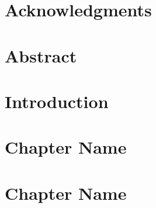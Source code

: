 \documentclass[11pt]{book}
\renewcommand{\baselinestretch}{1.2}
\begin{document}



\newpage
\thispagestyle{empty}
\renewcommand{\thesisdedication}{{\large Copyright \copyright~~Vishva Saravanan Ramasubramanian, 2024\\}{\large All Rights Reserved\\}}
\thesisdedicationpage



\newpage
\thispagestyle{empty}
\renewcommand{\thesisdedication}{\large To my family and friends.}
\thesisdedicationpage

\mastersthesis
\renewcommand{\baselinestretch}{1.5}

\chapter*{Acknowledgments}
\label{ch:ack}


\chapter*{Abstract}
\label{ch:abstract}


\tableofcontents
\listoffigures
\listoftables

\chapter{Introduction}
\label{ch:intro}



\chapter{Chapter Name}
\label{ch:chap2}



\chapter{Chapter Name}
\label{ch:chap3}


\end{document}
